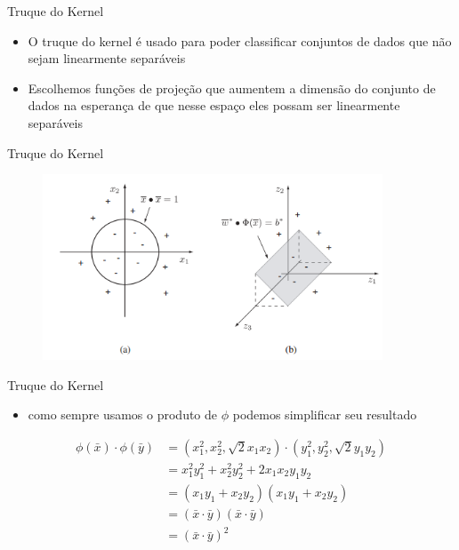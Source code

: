 \documentclass{beamer}
\begin{document}
\begin{frame}{Truque do Kernel}
\begin{itemize}
    \item O truque do kernel é usado para poder classificar conjuntos de dados que não sejam linearmente separáveis
    \item Escolhemos funções de projeção que aumentem a dimensão do conjunto de dados na esperança de que nesse espaço eles possam ser linearmente separáveis
\end{itemize}
\end{frame}

\begin{frame}{Truque do Kernel}
\begin{figure}
    \centering
    \includegraphics[width=0.9\textwidth]{svm_5.png}
\end{figure}
\end{frame}

\begin{frame}{Truque do Kernel}
\begin{itemize}
    \item como sempre usamos o produto de $\phi$ podemos simplificar seu resultado
\end{itemize}
        \begin{equation}
        \begin{split}
        \phi(\bar{x})\cdot \phi(\bar{y}) &= (x_1^2,x_2^2,\sqrt{2}x_1x_2) \cdot (y_1^2,y_2^2,\sqrt{2}y_1y_2) \\
        &=x_1^2y_1^2+x_2^2y_2^2+2x_1x_2y_1y_2 \\
        &=(x_1y_1+x_2y_2)(x_1y_1+x_2y_2) \\
        &=(\bar{x}\cdot\bar{y})(\bar{x}\cdot\bar{y}) \\
        &=(\bar{x}\cdot\bar{y})^2
        \end{split}
        \end{equation}
\end{frame}
\end{document}
